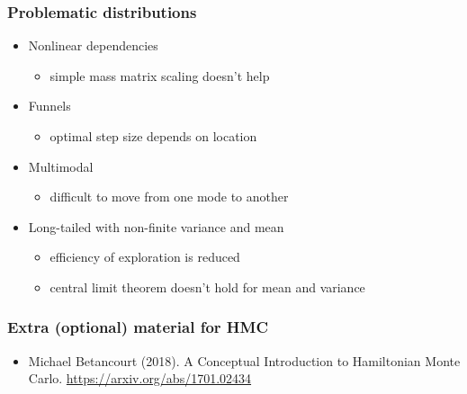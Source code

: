 \documentclass[10pt]{beamer}
\begin{document}
\begin{frame}
\begin{itemize}
  \end{itemize}
\end{frame}

\begin{frame}

\frametitle{Problematic distributions}

  \begin{itemize}
  \item<1-> Nonlinear dependencies
    \begin{itemize}
    \item simple mass matrix scaling doesn't help
    \end{itemize}
  \item<2-> Funnels
    \begin{itemize}
    \item optimal step size depends on location
    \end{itemize}
  \item<3-> Multimodal
    \begin{itemize}
    \item difficult to move from one mode to another
    \end{itemize}
  \item<4-> Long-tailed with non-finite variance and mean
    \begin{itemize}
    \item efficiency of exploration is reduced
    \item central limit theorem doesn't hold for mean and variance
    \end{itemize}
  \end{itemize}

\end{frame}

\begin{frame}

\frametitle{Extra (optional) material for HMC}

  \begin{itemize}
  \item Michael Betancourt (2018).  A Conceptual Introduction to
    Hamiltonian Monte Carlo. \url{https://arxiv.org/abs/1701.02434}
  \end{itemize}

\end{frame}
\end{document}
